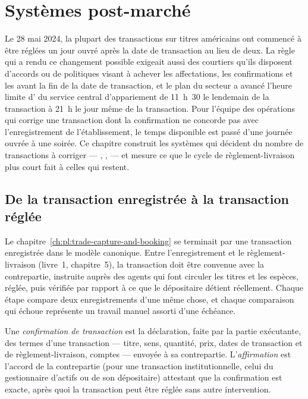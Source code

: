 \chapter{Systèmes post-marché}\label{ch:pl:post-trade-systems}

Le 28 mai 2024, la plupart des transactions sur titres américains ont commencé à être réglées un jour ouvré après la date de transaction au lieu de deux. La règle qui a rendu ce changement possible
exigeait aussi des courtiers qu'ils disposent d'accords ou de politiques visant à achever les affectations, les confirmations et les  avant la fin de la
date de transaction, et le
plan du secteur a avancé l'heure limite d' du service central d'appariement de 11~h~30 le lendemain de la transaction à 21~h le jour
même de la transaction. Pour l'équipe des opérations qui corrige une transaction dont la confirmation ne concorde pas avec l'enregistrement de l'établissement, le temps disponible est passé d'une
journée ouvrée à une soirée. Ce chapitre construit les systèmes qui décident du nombre de transactions à corriger --- , ,
 --- et mesure ce que le cycle de règlement-livraison plus court fait à celles qui restent.

\section{De la transaction enregistrée à la transaction réglée}

Le chapitre~\ref{ch:pl:trade-capture-and-booking} se terminait par une transaction enregistrée dans le modèle canonique. Entre l'enregistrement et le règlement-livraison (livre~1,
chapitre~5), la transaction doit être convenue avec la contrepartie, instruite auprès des agents qui font circuler les titres et les espèces, réglée, puis
vérifiée par rapport à ce que le dépositaire détient réellement. Chaque étape compare deux enregistrements d'une même chose, et chaque comparaison qui échoue représente
un travail manuel assorti d'une échéance.

\begin{definition}\label{def:pl:post-trade-systems:confirmation}
Une \emph{confirmation de transaction} est la déclaration, faite par la partie exécutante, des termes d'une transaction --- titre, sens, quantité, prix,
dates de transaction et de règlement-livraison, comptes --- envoyée à sa contrepartie. L'\emph{affirmation} est l'accord de la contrepartie (pour une
transaction institutionnelle, celui du gestionnaire d'actifs ou de son dépositaire) attestant que la confirmation est exacte, après quoi la transaction peut être
réglée sans autre intervention.
\end{definition}

